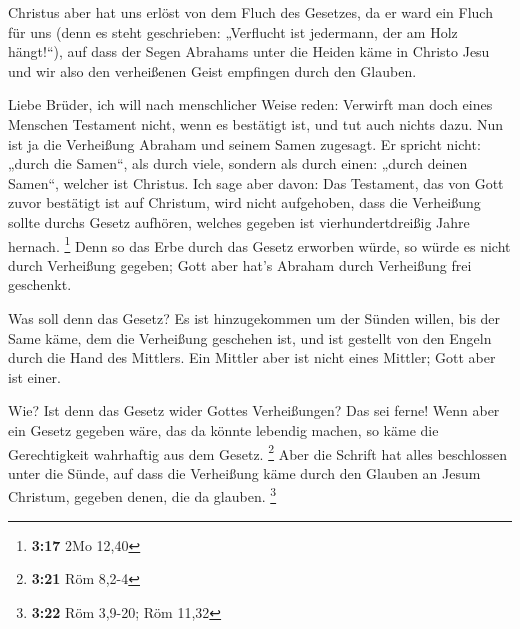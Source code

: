  Christus aber hat uns erlöst von dem Fluch des Gesetzes,
da er ward ein Fluch für uns (denn es steht geschrieben: „Verflucht ist
jedermann, der am Holz hängt!{}``),  auf dass der Segen
Abrahams unter die Heiden käme in Christo Jesu und wir also den
verheißenen Geist empfingen durch den Glauben.

 Liebe Brüder, ich will nach menschlicher Weise reden:
Verwirft man doch eines Menschen Testament nicht, wenn es bestätigt ist,
und tut auch nichts dazu.  Nun ist ja die Verheißung
Abraham und seinem Samen zugesagt. Er spricht nicht: „durch die Samen``,
als durch viele, sondern als durch einen: „durch deinen Samen``, welcher
ist Christus.  Ich sage aber davon: Das Testament, das von
Gott zuvor bestätigt ist auf Christum, wird nicht aufgehoben, dass die
Verheißung sollte durchs Gesetz aufhören, welches gegeben ist
vierhundertdreißig Jahre hernach. \footnote{\textbf{3:17} 2Mo 12,40}
 Denn so das Erbe durch das Gesetz erworben würde, so würde
es nicht durch Verheißung gegeben; Gott aber hat's Abraham durch
Verheißung frei geschenkt.

 Was soll denn das Gesetz? Es ist hinzugekommen um der
Sünden willen, bis der Same käme, dem die Verheißung geschehen ist, und
ist gestellt von den Engeln durch die Hand des Mittlers. 
Ein Mittler aber ist nicht eines Mittler; Gott aber ist einer.

 Wie? Ist denn das Gesetz wider Gottes Verheißungen? Das
sei ferne! Wenn aber ein Gesetz gegeben wäre, das da könnte lebendig
machen, so käme die Gerechtigkeit wahrhaftig aus dem Gesetz. \footnote{\textbf{3:21}
  Röm 8,2-4}  Aber die Schrift hat alles beschlossen unter
die Sünde, auf dass die Verheißung käme durch den Glauben an Jesum
Christum, gegeben denen, die da glauben. \footnote{\textbf{3:22} Röm
  3,9-20; Röm 11,32}

